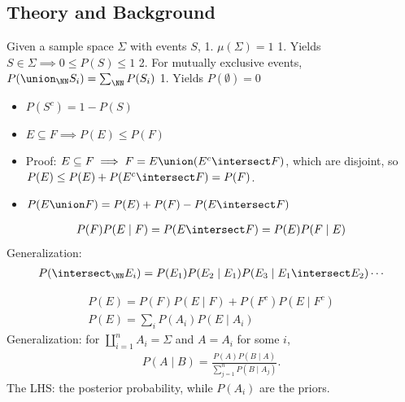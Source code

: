 \hypertarget{theory-and-background}{%
\subsection{Theory and Background}\label{theory-and-background}}

\begin{definition}

Given a sample space \(\Sigma\) with events \(S\), 1.
\(\mu(\Sigma) = 1\) 1. Yields
\(S \in \Sigma \implies 0 \leq P(S) \leq 1\) 2. For mutually exclusive
events, \(P(\union_\NN S_i) = \sum_\NN P(S_i)\) 1. Yields
\(P(\emptyset) = 0\)

\end{definition}

\begin{proposition}

\envlist

\begin{itemize}
\tightlist
\item
  \(P(S^c) = 1 - P(S)\)
\item
  \(E \subseteq F \implies P(E) \leq P(F)\)
\item
  Proof: \(E \subseteq F \implies F = E \union (E^c \intersect F)\),
  which are disjoint, so
  \(P(E) \leq P(E) + P(E^c \intersect F) = P(F)\).
\item
  \(P(E \union F) = P(E) + P(F) - P(E \intersect F)\)
\end{itemize}

\end{proposition}

\begin{definition}

\begin{align*}
P(F)P(E \mid F) = P(E \intersect F) = P(E)P(F \mid E)
\end{align*} Generalization:
\begin{align*}
P(\intersect_\NN E_i) = P(E_1) P(E_2 \mid E_1)P(E_3\mid E_1 \intersect E_2) \cdots
\end{align*}

\end{definition}

\begin{theorem}

\begin{align*}
P(E) = P(F)P(E \mid F) + P(F^c)P(E \mid F^c) \\
P(E) = \sum_i P(A_i) P(E \mid A_i)
\end{align*} Generalization: for \(\coprod_{i=1}^n A_i = \Sigma\) and
\(A=A_i\) for some \(i\),
\begin{align*}  
P(A \mid B) = \frac{P(A)P(B\mid A)}{\sum_{j = 1}^n P(B \mid A_j)}
.\end{align*} The LHS: the posterior probability, while \(P(A_i)\) are
the priors.

\end{theorem}


